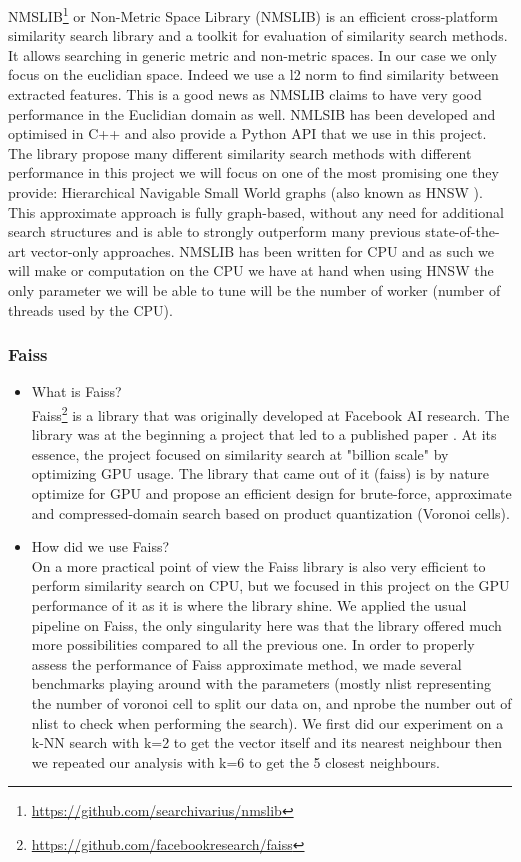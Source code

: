 \documentclass[a4paper]{article}
\begin{document}
NMSLIB\footnote{\url{https://github.com/searchivarius/nmslib}} or Non-Metric Space Library (NMSLIB) is an efficient cross-platform similarity search library and a toolkit for evaluation of similarity search methods. It allows searching in generic metric and non-metric spaces. In our case we only focus on the euclidian space. Indeed we use a l2 norm to find similarity between extracted features. This is a good news as NMSLIB claims to have very good performance in the Euclidian domain as well. NMLSIB has been developed and optimised in C++ and also provide a Python API that we use in this project. The library propose many different similarity search methods with different performance in this project we will focus on one of the most promising one they provide: Hierarchical Navigable Small World graphs (also known as HNSW \cite{HNSW}). This approximate approach is fully graph-based, without any need for additional search structures and is able to strongly outperform many previous state-of-the-art vector-only approaches. NMSLIB has been written for CPU and as such we will make or computation on the CPU we have at hand when using HNSW the only parameter we will be able to tune will be the number of worker (number of threads used by the CPU).

\subsubsection{Faiss}
\begin{itemize}
	\item What is Faiss? \vspace{5pt} \\
	Faiss\footnote{\url{https://github.com/facebookresearch/faiss}} is a library that was originally developed at Facebook AI research. The library was at the beginning a project that led to a published paper \cite{faiss}. At its essence, the project focused on similarity search at "billion scale" by optimizing GPU usage. The library that came out of it (faiss) is by nature optimize for GPU and propose an efficient design for brute-force, approximate and compressed-domain search based on product quantization (Voronoi cells).
	\item How did we use Faiss? \vspace{5pt} \\
	On a more practical point of view the Faiss library is also very efficient to perform similarity search on CPU, but we focused in this project on the GPU performance of it as it is where the library shine. We applied the usual pipeline on Faiss, the only singularity here was that the library offered much more possibilities compared to all the previous one. In order to properly assess the performance of Faiss approximate method, we made several benchmarks playing around with the parameters (mostly nlist representing the number of voronoi cell to split our data on, and nprobe the number out of nlist to check when performing the search). We first did our experiment on a k-NN search with k=2 to get the vector itself and its nearest neighbour then we repeated our analysis with k=6 to get the 5 closest neighbours.
\end{itemize}
\end{document}

